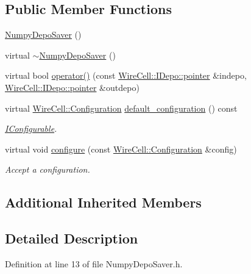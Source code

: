 \subsection*{Public Member Functions}
\begin{DoxyCompactItemize}
\item 
\hyperlink{class_wire_cell_1_1_sio_1_1_numpy_depo_saver_ab132db22c5ca296a5197903677a63e67}{Numpy\+Depo\+Saver} ()
\item 
virtual \hyperlink{class_wire_cell_1_1_sio_1_1_numpy_depo_saver_a4f5f01d9c15dc7ce1ae8e401fc0cb8fb}{$\sim$\+Numpy\+Depo\+Saver} ()
\item 
virtual bool \hyperlink{class_wire_cell_1_1_sio_1_1_numpy_depo_saver_a7acd0f6b49869550ed2eb38f88def1f2}{operator()} (const \hyperlink{class_wire_cell_1_1_i_data_aff870b3ae8333cf9265941eef62498bc}{Wire\+Cell\+::\+I\+Depo\+::pointer} \&indepo, \hyperlink{class_wire_cell_1_1_i_data_aff870b3ae8333cf9265941eef62498bc}{Wire\+Cell\+::\+I\+Depo\+::pointer} \&outdepo)
\item 
virtual \hyperlink{namespace_wire_cell_a9f705541fc1d46c608b3d32c182333ee}{Wire\+Cell\+::\+Configuration} \hyperlink{class_wire_cell_1_1_sio_1_1_numpy_depo_saver_a84ddceb500e4627d7e9e4f8b030d5b7d}{default\+\_\+configuration} () const
\begin{DoxyCompactList}\small\item\em \hyperlink{class_wire_cell_1_1_i_configurable}{I\+Configurable}. \end{DoxyCompactList}\item 
virtual void \hyperlink{class_wire_cell_1_1_sio_1_1_numpy_depo_saver_a33359dc999dec442d46e74847a3d3e0b}{configure} (const \hyperlink{namespace_wire_cell_a9f705541fc1d46c608b3d32c182333ee}{Wire\+Cell\+::\+Configuration} \&config)
\begin{DoxyCompactList}\small\item\em Accept a configuration. \end{DoxyCompactList}\end{DoxyCompactItemize}
\subsection*{Additional Inherited Members}


\subsection{Detailed Description}


Definition at line 13 of file Numpy\+Depo\+Saver.\+h.




